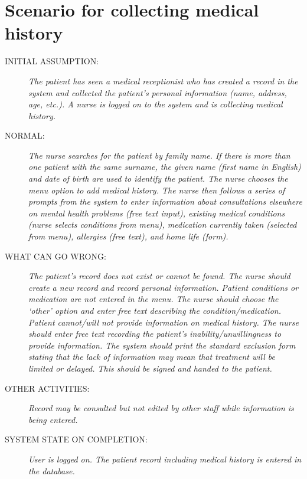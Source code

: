 \section{Scenario for collecting medical history}
\begin{description}
  \item [INITIAL ASSUMPTION:]
    \textit{The patient has seen a medical receptionist who has created a record in the 
    system and collected the patient’s personal information (name, address, age,
    etc.). A nurse is logged on to the system and is collecting medical history.}
  \item [NORMAL:]
    \textit{The nurse searches for the patient by family name. If there is more than
    one patient with the same surname, the given name (first name in English)
    and date of birth are used to identify the patient. \newline
    The nurse chooses the menu option to add medical history.  \newline
    The nurse then follows a series of prompts from the system to enter
    information about consultations elsewhere on mental health problems (free
    text input), existing medical conditions (nurse selects conditions from
    menu), medication currently taken (selected from menu), allergies (free
    text), and home life (form).}
  \item [WHAT CAN GO WRONG:]
    \textit{The patient’s record does not exist or cannot be found. The nurse should
    create a new record and record personal information. \newline
    Patient conditions or medication are not entered in the menu. The nurse
    should choose the ‘other’ option and enter free text describing the
    condition/medication. \newline
    Patient cannot/will not provide information on medical history. The nurse
    should enter free text recording the patient’s inability/unwillingness to
    provide information. The system should print the standard exclusion form   
    stating that the lack of information may mean that treatment will be
    limited or delayed. This should be signed and handed to the patient.}
  \item [OTHER ACTIVITIES:]
    \textit{Record may be consulted but not edited by other staff while information is
    being entered.}
  \item [SYSTEM STATE ON COMPLETION:]
    \textit{User is logged on. The patient record including medical history is entered
    in the database.}
\end{description}
